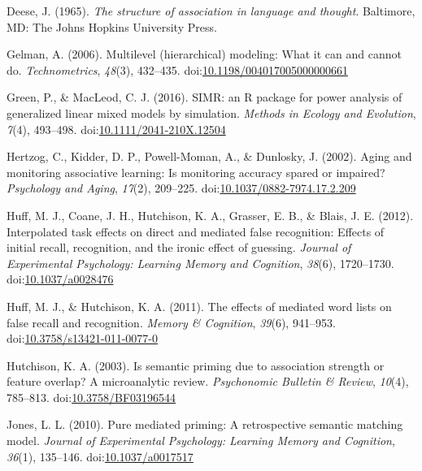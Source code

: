 \documentclass[english,,man]{apa6}
\begin{document}
\leavevmode\hypertarget{ref-Deese1965}{}%
Deese, J. (1965). \emph{The structure of association in language and thought}. Baltimore, MD: The Johns Hopkins University Press.

\leavevmode\hypertarget{ref-Gelman2006}{}%
Gelman, A. (2006). Multilevel (hierarchical) modeling: What it can and cannot do. \emph{Technometrics}, \emph{48}(3), 432--435. doi:\href{https://doi.org/10.1198/004017005000000661}{10.1198/004017005000000661}

\leavevmode\hypertarget{ref-Green2016}{}%
Green, P., \& MacLeod, C. J. (2016). SIMR: an R package for power analysis of generalized linear mixed models by simulation. \emph{Methods in Ecology and Evolution}, \emph{7}(4), 493--498. doi:\href{https://doi.org/10.1111/2041-210X.12504}{10.1111/2041-210X.12504}

\leavevmode\hypertarget{ref-Hertzog2002}{}%
Hertzog, C., Kidder, D. P., Powell-Moman, A., \& Dunlosky, J. (2002). Aging and monitoring associative learning: Is monitoring accuracy spared or impaired? \emph{Psychology and Aging}, \emph{17}(2), 209--225. doi:\href{https://doi.org/10.1037/0882-7974.17.2.209}{10.1037/0882-7974.17.2.209}

\leavevmode\hypertarget{ref-Huff2012b}{}%
Huff, M. J., Coane, J. H., Hutchison, K. A., Grasser, E. B., \& Blais, J. E. (2012). Interpolated task effects on direct and mediated false recognition: Effects of initial recall, recognition, and the ironic effect of guessing. \emph{Journal of Experimental Psychology: Learning Memory and Cognition}, \emph{38}(6), 1720--1730. doi:\href{https://doi.org/10.1037/a0028476}{10.1037/a0028476}

\leavevmode\hypertarget{ref-Huff2011}{}%
Huff, M. J., \& Hutchison, K. A. (2011). The effects of mediated word lists on false recall and recognition. \emph{Memory \& Cognition}, \emph{39}(6), 941--953. doi:\href{https://doi.org/10.3758/s13421-011-0077-0}{10.3758/s13421-011-0077-0}

\leavevmode\hypertarget{ref-Hutchison2003}{}%
Hutchison, K. A. (2003). Is semantic priming due to association strength or feature overlap? A microanalytic review. \emph{Psychonomic Bulletin \& Review}, \emph{10}(4), 785--813. doi:\href{https://doi.org/10.3758/BF03196544}{10.3758/BF03196544}

\leavevmode\hypertarget{ref-Jones2010}{}%
Jones, L. L. (2010). Pure mediated priming: A retrospective semantic matching model. \emph{Journal of Experimental Psychology: Learning Memory and Cognition}, \emph{36}(1), 135--146. doi:\href{https://doi.org/10.1037/a0017517}{10.1037/a0017517}
\end{document}
